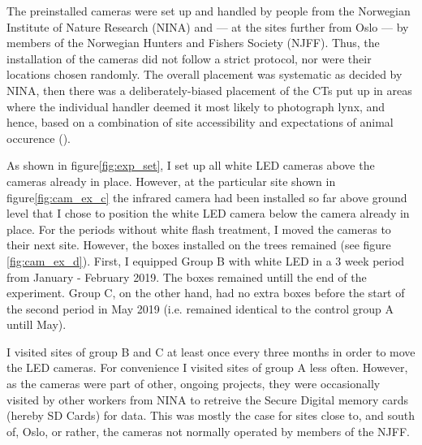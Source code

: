 The preinstalled cameras were set up and handled by people from the Norwegian Institute of Nature Research (NINA) and --- at the sites further from Oslo  --- by members of the Norwegian Hunters and Fishers Society (NJFF). 
Thus, the installation of the cameras did not follow a strict protocol, nor were their locations chosen randomly. The overall placement was systematic as decided by NINA, then there was a deliberately-biased placement of the CTs put up in areas where the individual handler deemed it most likely to photograph lynx,
and hence, based on a combination of site accessibility and expectations of animal occurence (\cite{Burton2015}). %


As shown in figure\vref{fig:exp_set}, I set up all white LED cameras above the cameras already in place. 
However, at the particular site shown in figure\vref{fig:cam_ex_c} the infrared camera had been installed so far above ground level that I chose to position the white LED camera below the camera already in place. %
For the periods without white flash treatment, I moved the cameras to their next site. However, the boxes installed on the trees remained (see figure \ref{fig:cam_ex_d}).
First, I equipped Group B with white LED in a 3 week period from January - February 2019. The boxes remained untill the end of the experiment. Group C, on the other hand, had no extra boxes before the start of the second period in May 2019 (i.e. remained identical to the control group A untill May).


I visited sites of group B and C at least once every three months in order to move the LED cameras. For convenience I visited sites of group A less often. %
However, as the cameras were part of other, ongoing projects, they were occasionally visited by other workers from NINA to retreive the Secure Digital memory cards (hereby SD Cards) for data. %
This was mostly the case for sites close to, and south of, Oslo, or rather, the cameras not normally operated by members of the NJFF.



